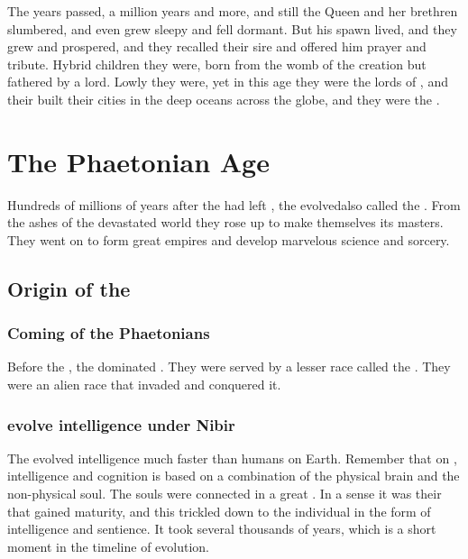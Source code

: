 The years passed, a million years and more, and still the \Kraken{} Queen and her brethren slumbered, and even \Moroch{} grew sleepy and fell dormant. But his spawn lived, and they grew and prospered, and they recalled their sire and offered him prayer and tribute. Hybrid children they were, born from the womb of the \psp{\voyagers} creation but fathered by a \kraken{} lord. Lowly they were, yet in this age they were the lords of \Miith{}, and their built their cities in the deep oceans across the globe, and they were the \nagae{}. 















\section{The Phaetonian Age}
Hundreds of millions of years after the \voyagers{} had left \Miith{}, the \ophidians{} evolved\dash also called the \caisith. 
From the ashes of the devastated world they rose up to make themselves its masters.
They went on to form great empires and develop marvelous science and sorcery.









\subsection{Origin of the \ophidians}





\subsubsection{Coming of the Phaetonians}
Before the \ophidians, the  dominated \Miith. 
They were served by a lesser race called the . 
They were an alien race that invaded \Miith and conquered it. 





\subsubsection{\Caisith evolve intelligence under Nibir}
The \caisith evolved intelligence much faster than humans on Earth. 
Remember that on \Miith, intelligence and cognition is based on a combination of the physical brain and the non-physical soul. 
The \caisith souls were connected in a great \nexus. 
In a sense it was their \nexus that gained maturity, and this trickled down to the individual \caisith in the form of intelligence and sentience. 
It took several thousands of years, which is a short moment in the timeline of evolution. 

